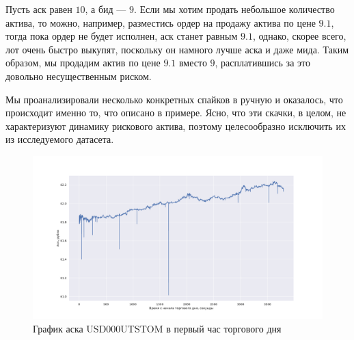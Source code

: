 \begin{example}
    Пусть аск равен $10$, а бид --- $9$. Если мы хотим продать небольшое количество актива, то можно, например, разместись ордер
    на продажу актива по цене $9.1$, тогда пока ордер не будет исполнен, аск станет равным $9.1$, однако, скорее всего, лот очень
    быстро выкупят, поскольку он намного лучше аска и даже мида. Таким образом, мы продадим актив по цене $9.1$ вместо $9$, 
    расплатившись за это довольно несущественным риском.
\end{example}

Мы проанализировали несколько конкретных спайков в ручную и оказалось, что происходит именно то, что описано в примере. 
Ясно, что эти скачки, в целом, не характеризуют
динамику рискового актива, поэтому целесообразно исключить их из исследуемого датасета. \par

\begin{figure}
    \includegraphics[scale=0.41]{fig/Palki.pdf}
    \caption{График аска USD000UTSTOM в первый час торгового дня}
    \label{askgraph}
\end{figure}

